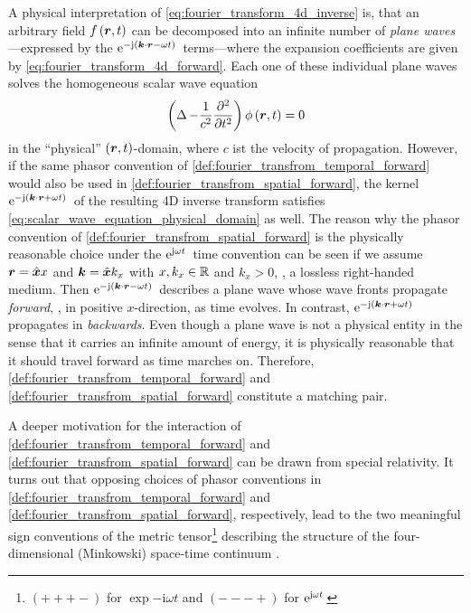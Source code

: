 A physical interpretation of \eqref{eq:fourier_transform_4d_inverse} is,
that an arbitrary field $f \left( \robs, t \right)$ can be decomposed 
into an infinite number of \emph{plane waves}---expressed by the
$\exp{-\im \left( \pvec{k} \cdot \robs - \omega t \right)}$ terms---where
the expansion coefficients are given by \eqref{eq:fourier_transform_4d_forward}.
Each one of these individual plane waves solves
the homogeneous scalar wave equation \cite[p.~32]{Sommerfeld1964}
\begin{equation}\label{eq:scalar_wave_equation_physical_domain}
	\left( \laplace - \frac{1}{c^2} \frac{\partial^2}{\partial t^2} \right)	
	\phi \left( \pvec{r}, t \right) = 0
\end{equation}
in the \enquote{physical} $\left(\pvec{r}, t\right)$-domain, where $c$ ist
the velocity of propagation.
However, if the same phasor convention of
\cref{def:fourier_transfrom_temporal_forward} would also be used in
\cref{def:fourier_transfrom_spatial_forward}, the kernel
$\exp{-\im \left( \pvec{k} \cdot \robs + \omega t \right)}$
of the resulting 4D inverse transform satisfies
\eqref{eq:scalar_wave_equation_physical_domain} as well.
The reason why the phasor convention of
\cref{def:fourier_transfrom_spatial_forward} is the physically reasonable choice
under the $\mathrm{e}^{\mathrm{j} \omega t}\,$ time convention
can be seen if we assume $\pvec{r} = \uv{x} x$ and $\pvec{k} = \uv{x} k_x$
with $x, k_x \in \mathbb{R}$ and $k_x > 0$, \ie, a lossless right-handed medium.
Then $\exp{-\im \left( \pvec{k} \cdot \robs - \omega t \right)}$ describes
a plane wave whose wave fronts propagate \emph{forward}, \ie, in positive
$x$-direction, as time evolves.
In contrast,
$\exp{-\im \left( \pvec{k} \cdot \robs + \omega t \right)}$
propagates in \emph{backwards}.
Even though a plane wave is not a physical entity in the sense that it carries
an infinite amount of energy, it is physically reasonable that it should
travel forward as time marches on.
Therefore, \cref{def:fourier_transfrom_temporal_forward} and
\cref{def:fourier_transfrom_spatial_forward} constitute a matching pair.

A deeper motivation for the interaction of
\cref{def:fourier_transfrom_temporal_forward} and 
\cref{def:fourier_transfrom_spatial_forward} can be drawn from special
relativity.
It turns out that opposing choices of phasor conventions in
\cref{def:fourier_transfrom_temporal_forward} and
\cref{def:fourier_transfrom_spatial_forward}, respectively, lead to the two
meaningful sign conventions of the metric tensor\footnote{
	$\left( + + + - \right)$ for $\exp{-\mathrm{i} \omega t}$
	and $\left( - - - + \right)$ for $\mathrm{e}^{\mathrm{j} \omega t}\,$}
describing the structure of the four-dimensional (Minkowski) space-time
continuum \cite[pp.~624]{Jackson2013}\cite{Kaiser2016}.







